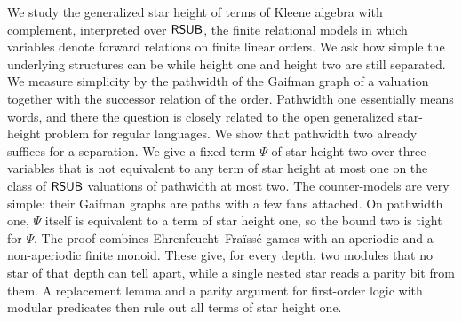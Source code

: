 We study the generalized star height of terms of Kleene algebra with complement, interpreted over $\mathsf{RSUB}$, the finite relational models in which variables denote forward relations on finite linear orders.
We ask how simple the underlying structures can be while height one and height two are still separated.
We measure simplicity by the pathwidth of the Gaifman graph of a valuation together with the successor relation of the order.
Pathwidth one essentially means words, and there the question is closely related to the open generalized star-height problem for regular languages.
We show that pathwidth two already suffices for a separation.
We give a fixed term $\Psi$ of star height two over three variables that is not equivalent to any term of star height at most one on the class of $\mathsf{RSUB}$ valuations of pathwidth at most two.
The counter-models are very simple: their Gaifman graphs are paths with a few fans attached.
On pathwidth one, $\Psi$ itself is equivalent to a term of star height one, so the bound two is tight for $\Psi$.
The proof combines Ehrenfeucht--Fra\"iss\'e games with an aperiodic and a non-aperiodic finite monoid.
These give, for every depth, two modules that no star of that depth can tell apart, while a single nested star reads a parity bit from them.
A replacement lemma and a parity argument for first-order logic with modular predicates then rule out all terms of star height one.
